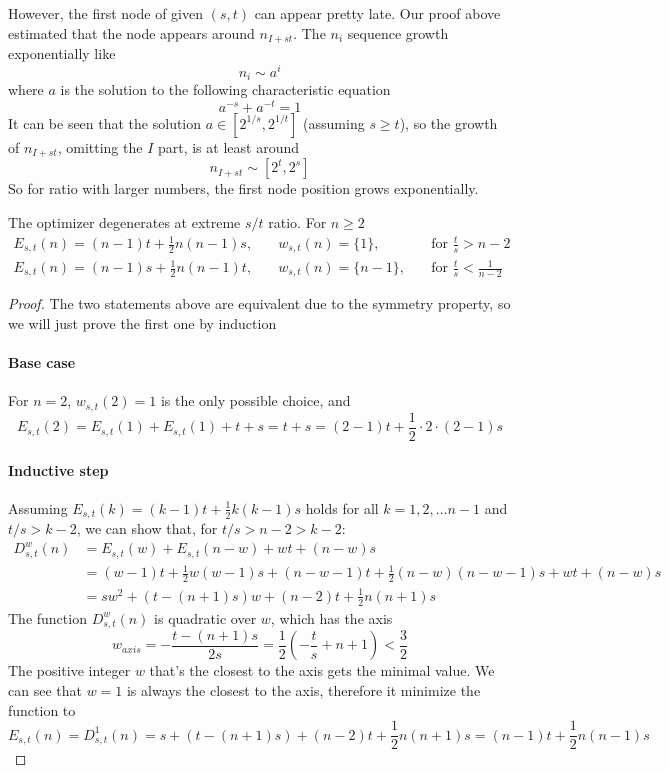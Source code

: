 \documentclass[]{article}
\begin{document}
However, the first node of given $(s, t)$ can appear pretty late. Our proof above estimated that the node appears around $n_{I+st}$. The $n_i$ sequence growth exponentially like 
\[
n_i \sim a^i
\]
where $a$ is the solution to the following characteristic equation
\[
a^{-s} + a^{-t} = 1
\]
It can be seen that the solution $a \in [2^{1/s}, 2^{1/t}]$ (assuming $s \geq t$), so the growth of $n_{I+st}$, omitting the $I$ part, is at least around 
\[
n_{I+st} \sim  [2^t, 2^s]
\]
So for ratio with larger numbers, the first node position grows exponentially.

\vspace{1cm}
\begin{lemma}[Mode $M_0$] The optimizer degenerates at extreme $s/t$ ratio. For $n \geq2$
	\begin{align*}
	E_{s,t}(n) = (n-1)t + \frac{1}{2}n(n-1)s,\quad & w_{s,t}(n) = \{1\},\quad  &\text{for } \frac{t}{s} > n - 2 \\
	E_{s,t}(n) = (n-1)s + \frac{1}{2}n(n-1)t,\quad & w_{s,t}(n) = \{n-1\},\quad  &\text{for } \frac{t}{s} < \frac{1}{n-2}
	\end{align*}
\end{lemma}
\begin{proof}
	The two statements above are equivalent due to the symmetry property, so we will just prove the first one by induction
	\paragraph{Base case} For $n=2$, $w_{s,t}(2) = 1$ is the only possible choice, and
	\[
	E_{s,t}(2) = E_{s,t}(1) + E_{s,t}(1) + t + s = t + s = (2-1)t + \frac{1}{2}\cdot 2 \cdot (2-1) s
	\]
	\paragraph{Inductive step} Assuming $E_{s,t}(k) = (k-1)t + \frac{1}{2}k(k-1)s$ holds for all $k = 1,2,\dots n-1$ and $t/s > k - 2$, we can show that, for $t/s > n - 2 > k - 2$:
	\begin{align*}
	D^w_{s,t}(n) &= E_{s,t}(w) + E_{s,t}(n-w)+wt+(n-w)s \\
	&=(w-1)t + \frac{1}{2}w(w-1)s + (n-w-1)t + \frac{1}{2}(n-w)(n-w-1)s+wt+(n-w)s\\
	&= sw^2 + (t-(n+1)s)w + (n-2)t + \frac{1}{2}n(n+1)s 
	\end{align*}
	The function $D^w_{s,t}(n)$ is quadratic over $w$, which has the axis 
	\[
		w_{axis} = -\frac{t-(n+1)s}{2s} = \frac{1}{2}\left(-\frac{t}{s} + n+1\right) < \frac{3}{2}
	\]
	The positive integer $w$ that's the closest to the axis gets the minimal value. We can see that $w=1$ is always the closest to the axis, therefore it minimize the function to
	\[
		E_{s,t}(n) = D^1_{s,t}(n) =s + (t-(n+1)s) + (n-2)t + \frac{1}{2}n(n+1)s = (n-1)t + \frac{1}{2}n(n-1)s
	\]
\end{proof}
\end{document}
